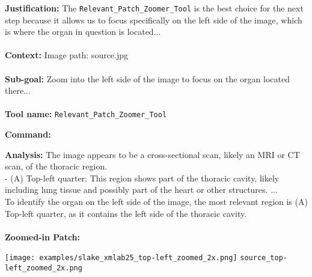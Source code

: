 \begin{plannerbox}

\textbf{Justification:}
The \texttt{Relevant\_Patch\_Zoomer\_Tool} is the best choice for the next step because it allows us to focus specifically on the left side of the image, which is where the organ in question is located...
\\\\
\textbf{Context:}
Image path: source.jpg
\\\\
\textbf{Sub-goal:}
Zoom into the left side of the image to focus on the organ located there...
\\\\
\textbf{Tool name:}
\texttt{Relevant\_Patch\_Zoomer\_Tool}

\end{plannerbox}


\begin{executorbox}
\textbf{Command:}
\end{executorbox}


\begin{executorbox}
\textbf{Analysis:}
The image appears to be a cross-sectional scan, likely an MRI or CT scan, of the thoracic region.\\
- (A) Top-left quarter: This region shows part of the thoracic cavity, likely including lung tissue and possibly part of the heart or other structures.
...\\
To identify the organ on the left side of the image, the most relevant region is (A) Top-left quarter, as it contains the left side of the thoracic cavity.
\\\\
\textbf{Zoomed-in Patch:}

\vspace{2pt}
\texttt{[image: examples/slake\_xmlab25\_top-left\_zoomed\_2x.png]}
\texttt{source\_top-left\_zoomed\_2x.png}
\end{executorbox}


